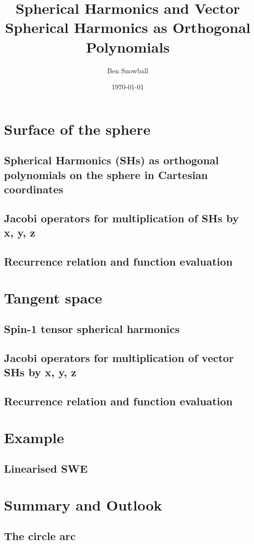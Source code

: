 \documentclass[10pt]{beamer}
\title{Spherical Harmonics and Vector Spherical Harmonics as Orthogonal Polynomials}
\author{Ben Snowball}
\date{\today}
\begin{document}
\frame{\titlepage}

\section[Outline]{}
\frame{\tableofcontents}
\section{Surface of the sphere}
\subsection{Spherical Harmonics (SHs) as orthogonal polynomials on the sphere in Cartesian coordinates}
\subsection{Jacobi operators for multiplication of SHs by x, y, z}
\subsection{Recurrence relation and function evaluation}
\section{Tangent space}
\subsection{Spin-1 tensor spherical harmonics}
\subsection{Jacobi operators for multiplication of vector SHs by x, y, z}
\subsection{Recurrence relation and function evaluation}
\section{Example}
\subsection{Linearised SWE}
\section{Summary and Outlook}
\subsection{The circle arc}
\end{document}
